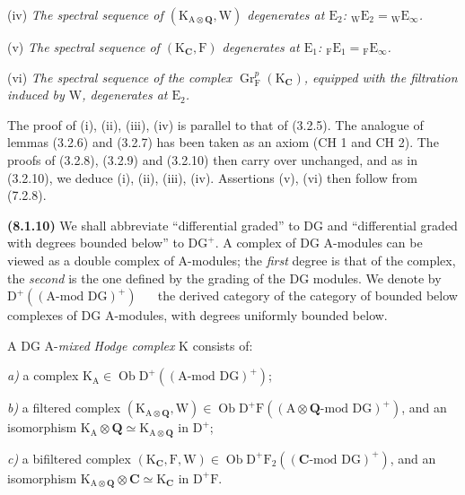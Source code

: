 \documentclass[11pt,leqno]{article}
\newcommand{\Page}[1]{\ifvmode\noindent\else\unskip\ \fi{\footnotesize\textcolor{gray}{[p.\,#1]}}\ \ignorespaces}
\begin{document}
(iv) \textit{The spectral sequence of \((\mathrm{K}_{\mathrm{A}\otimes\mathbf{Q}},\mathrm{W})\) degenerates at \(\mathrm{E}_{2}\): \({}_{\mathrm{W}}\mathrm{E}_{2}={}_{\mathrm{W}}\mathrm{E}_{\infty}\).}

(v) \textit{The spectral sequence of \((\mathrm{K}_{\mathbf{C}},\mathrm{F})\) degenerates at \(\mathrm{E}_{1}\): \({}_{\mathrm{F}}\mathrm{E}_{1}={}_{\mathrm{F}}\mathrm{E}_{\infty}\).}

(vi) \textit{The spectral sequence of the complex \(\operatorname{Gr}_{\mathrm{F}}^{p}(\mathrm{K}_{\mathbf{C}})\), equipped with the filtration induced by \(\mathrm{W}\), degenerates at \(\mathrm{E}_{2}\).}

The proof of (i), (ii), (iii), (iv) is parallel to that of (3.2.5). The analogue of lemmas (3.2.6) and (3.2.7) has been taken as an axiom (CH 1 and CH 2). The proofs of (3.2.8), (3.2.9) and (3.2.10) then carry over unchanged, and as in (3.2.10), we deduce (i), (ii), (iii), (iv). Assertions (v), (vi) then follow from (7.2.8).

\textbf{(8.1.10)} We shall abbreviate “differential graded” to \(\mathrm{DG}\) and “differential graded with degrees bounded below” to \(\mathrm{DG}^{+}\). A complex of \(\mathrm{DG}\) \(\mathrm{A}\)-modules can be viewed as a double complex of \(\mathrm{A}\)-modules; the \textit{first} degree is that of the complex, the \textit{second} is the one defined by the grading of the \(\mathrm{DG}\) modules. We denote by \(\mathrm{D}^{+}((\mathrm{A}\text{-mod }\mathrm{DG})^{+})\)
\Page{31}
the derived category of the category of bounded below complexes of \(\mathrm{DG}\) \(\mathrm{A}\)-modules, with degrees uniformly bounded below.

A \(\mathrm{DG}\) \(\mathrm{A}\)-\textit{mixed} \textit{Hodge complex} \(\mathrm{K}\) consists of:

\textit{a)} a complex \(\mathrm{K}_{\mathrm{A}}\in\operatorname{Ob}\mathrm{D}^{+}((\mathrm{A}\text{-mod }\mathrm{DG})^{+})\);

\textit{b)} a filtered complex \((\mathrm{K}_{\mathrm{A}\otimes\mathbf{Q}},\mathrm{W})\in\operatorname{Ob}\mathrm{D}^{+}\mathrm{F}((\mathrm{A}\otimes\mathbf{Q}\text{-mod }\mathrm{DG})^{+})\), and an isomorphism \(\mathrm{K}_{\mathrm{A}}\otimes\mathbf{Q}\simeq\mathrm{K}_{\mathrm{A}\otimes\mathbf{Q}}\) in \(\mathrm{D}^{+}\);

\textit{c)} a bifiltered complex \((\mathrm{K}_{\mathbf{C}},\mathrm{F},\mathrm{W})\in\operatorname{Ob}\mathrm{D}^{+}\mathrm{F}_{2}((\mathbf{C}\text{-mod }\mathrm{DG})^{+})\), and an isomorphism \(\mathrm{K}_{\mathrm{A}\otimes\mathbf{Q}}\otimes\mathbf{C}\simeq\mathrm{K}_{\mathbf{C}}\) in \(\mathrm{D}^{+}\mathrm{F}\).
\end{document}
